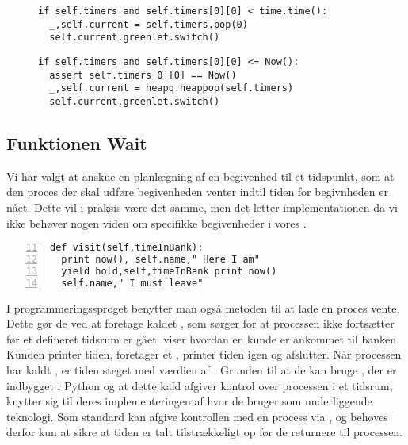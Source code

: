 \begin{figure}[hbtp]
\begin{minipage}[c]{\linewidth}
\begin{lstlisting}[firstnumber=204, label=fig:green:timer, caption=Udvælgelse af proces fra listen timers (fra scheduling.py)]
if self.timers and self.timers[0][0] < time.time():
  _,self.current = self.timers.pop(0)
  self.current.greenlet.switch()
\end{lstlisting}
\end{minipage}
\begin{minipage}[c]{\linewidth}
\begin{lstlisting}[firstnumber=124, label=fig:sim:timer, caption=Udvælgelse af proces fra listen timers (fra simulation.py)]
if self.timers and self.timers[0][0] <= Now():
  assert self.timers[0][0] == Now()
  _,self.current = heapq.heappop(self.timers)
  self.current.greenlet.switch()
\end{lstlisting}
\end{minipage}
\end{figure}


\subsection{Funktionen Wait}\label{sec:Wait}
Vi har valgt at anskue en planlægning af en begivenhed til et tidspunkt, som at den proces der skal udføre begivenheden venter indtil tiden for begivnheden er nået. Dette vil i praksis være det samme, men det letter implementationen da vi ikke behøver nogen viden om specifikke begivenheder i vores \sched. 

\begin{lstlisting}[firstnumber=11 , stepnumber=2, numbers=left,float=hbtp, label=fig:simpy:yield, caption= Et yield i \simpy (Taget fra Bank05.py i eksemplet fra \simpy)] 
def visit(self,timeInBank): 
  print now(), self.name," Here I am" 
  yield hold,self,timeInBank print now()
  self.name," I must leave" 
\end{lstlisting}
I programmeringssproget \simpy benytter man også metoden til at lade en proces vente. Dette gør de ved at
foretage kaldet , som sørger for at processen ikke
fortsætter før et defineret tidsrum er gået.  viser hvordan en kunde er ankommet til banken. Kunden printer tiden, foretager et , printer tiden igen og afslutter.  Når processen har kaldt , er tiden steget med værdien af . Grunden til at de kan bruge , der er indbygget i Python og at dette kald afgiver kontrol over processen i et tidsrum, knytter sig til deres implementeringen af \simpy hvor de bruger   som underliggende teknologi. Som standard kan   afgive kontrollen med en process via , og \simpy behøves derfor kun at sikre at tiden er talt tilstrækkeligt op før de returnere til processen.


